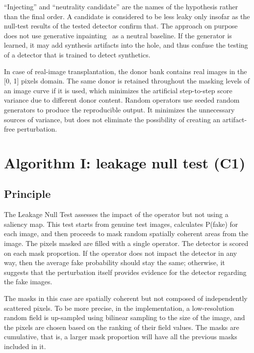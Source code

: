``Injecting''
and ``neutrality candidate'' are the names of the hypothesis rather than
the final order. A candidate is considered to be less leaky only insofar
as the null-test results of the tested detector confirm that. The
approach on purpose does not use generative inpainting~\cite{chang2019counterfactual, agarwal2020removing} as a neutral
baseline. If the generator is learned, it may add synthesis artifacts
into the hole, and thus confuse the testing of a detector that is
trained to detect synthetics.

In case of real-image transplantation, the donor bank contains real
images in the {[}0, 1{]} pixels domain. The same donor is retained
throughout the masking levels of an image curve if it is used, which
minimizes the artificial step-to-step score variance due to different
donor content. Random operators use seeded random generators to produce
the reproducible output. It minimizes the unnecessary sources of
variance, but does not eliminate the possibility of creating an
artifact-free perturbation.

\section{\texorpdfstring{\textbf{Algorithm I: leakage null test
(C1)}}{Algorithm I: leakage null test (C1)}}\label{algorithm-i-leakage-null-test-c1}

\subsection{\texorpdfstring{\textbf{Principle}}{Principle}}\label{principle}

The Leakage Null Test assesses the impact of the operator but not using
a saliency map. This test starts from genuine test images, calculates
P(fake) for each image, and then proceeds to mask random spatially
coherent areas from the image. The pixels masked are filled with a
single operator. The detector is scored on each mask proportion. If the
operator does not impact the detector in any way, then the average fake
probability should stay the same; otherwise, it suggests that the
perturbation itself provides evidence for the detector regarding the
fake images.

The masks in this case are spatially coherent but not composed of
independently scattered pixels. To be more precise, in the
implementation, a low-resolution random field is up-sampled using
bilinear sampling to the size of the image, and the pixels are chosen
based on the ranking of their field values. The masks are cumulative,
that is, a larger mask proportion will have all the previous masks
included in it.

